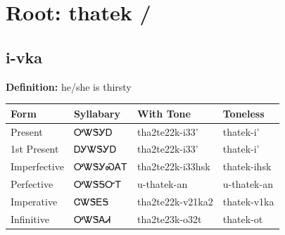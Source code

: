 \documentclass{article}%
\begin{document}
%
\normalsize%
\section*{Root: thatek / }%
\subsection*{i-vka}%
\textbf{Definition: }%
he/she is thirsty%
\\[0.5em]%
\begin{tabular}{|l|l|l|l|}%
\hline%
\textbf{Form}&\textbf{Syllabary}&\textbf{With Tone}&\textbf{Toneless}\\%
\hline%
Present&ᎤᏔᏕᎩᎠ&tha2te22k{-}i33'&thatek{-}i'\\%
1st Present&ᎠᎩᏔᏕᎩᎠ&tha2te22k{-}i33'&thatek{-}i'\\%
Imperfective&ᎤᏔᏕᎩᏍᎪᎢ&tha2te22k{-}i33hsk&thatek{-}ihsk\\%
Perfective&ᎤᏔᏕᎦᏅᎢ&u{-}thatek{-}an&u{-}thatek{-}an\\%
Imperative&ᏣᏔᏕᎬᎦ&tha2te22k{-}v21ka2&thatek{-}v1ka\\%
Infinitive&ᎤᏔᏕᎪᏗ&tha2te23k{-}o32t&thatek{-}ot\\%
\hline%
\end{tabular}%
\\[1em]%
\end{document}
